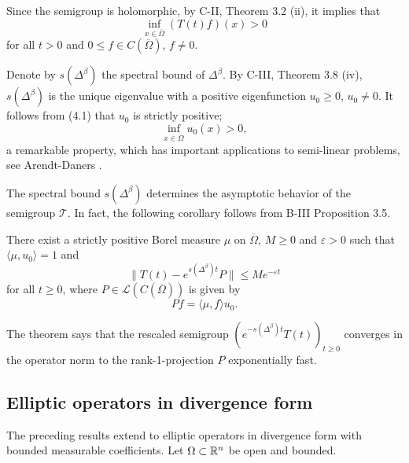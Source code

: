 Since the semigroup is holomorphic, by C-II, Theorem 3.2 (ii), it implies that
\begin{equation} \tag{4.1}
\inf_{x \in \overline{\Omega}} (T(t)f)(x) > 0
\end{equation}
for all $t > 0$ and $0 \leq f \in C(\overline{\Omega})$, $f \neq 0$.

Denote by $s(\Delta^\beta)$ the spectral bound of $\Delta^\beta$. 
By C-III, Theorem 3.8 (iv), $s(\Delta^\beta)$ is the unique eigenvalue with a positive eigenfunction $u_0 \geq 0$, $u_0 \neq 0$. 
It follows from (4.1) that $u_0$ is strictly positive; \ie
\[
	\inf_{x \in \overline{\Omega}} u_0(x) > 0,
\]
a remarkable property, which has important applications to semi-linear problems, see Arendt-Daners \cite{AD25}.

The spectral bound $s(\Delta^\beta)$ determines the asymptotic behavior of the semigroup $\mathcal{T}$. 
In fact, the following corollary follows from B-III Proposition 3.5.
\begin{corollary} 
There exist a strictly positive Borel measure $\mu$ on $\overline{\Omega}$, $M \geq 0$ and $\varepsilon > 0$ such that $\langle \mu, u_0 \rangle = 1$ and
\[\|T(t) - e^{s(\Delta^\beta)t}P\| \leq Me^{-\varepsilon t}\]
for all $t \geq 0$, where $P \in \mathcal{L}(C(\overline{\Omega}))$ is given by
\[Pf = \langle \mu, f \rangle u_0.\]
\end{corollary}
The theorem says that the rescaled semigroup $(e^{-s(\Delta^\beta)t}T(t))_{t \geq 0}$ converges in the operator norm to the rank-1-projection $P$ exponentially fast.
\subsection{Elliptic operators in divergence form}
The preceding results extend to elliptic operators in divergence form with bounded measurable coefficients. Let $\Omega \subset \mathbb{R}^n$ be open and bounded.

